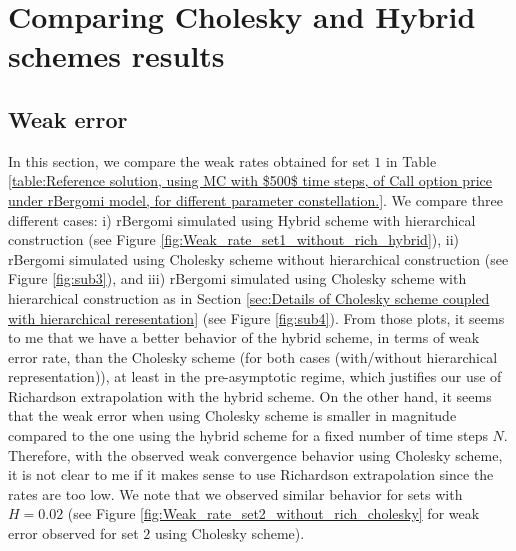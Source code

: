 \documentclass[11pt]{article}
\begin{document}



\section{Comparing Cholesky and Hybrid schemes results }

\subsection{Weak error}
In this section, we compare the weak rates obtained for set $1$ in Table
\ref{table:Reference solution, using MC with $500$ time steps, of Call option price under rBergomi model, for different parameter constellation.}. We compare three different cases: i) rBergomi simulated using Hybrid scheme with hierarchical construction (see Figure \ref{fig:Weak_rate_set1_without_rich_hybrid}), ii) rBergomi simulated using Cholesky scheme without hierarchical construction (see Figure \ref{fig:sub3}), and iii) rBergomi simulated using Cholesky scheme with hierarchical construction as in Section \ref{sec:Details of Cholesky scheme coupled with hierarchical reresentation} (see Figure \ref{fig:sub4}). From those plots, it seems to me that we have a better behavior of the hybrid scheme, in terms of weak error rate, than the Cholesky scheme (for both cases (with/without hierarchical representation)), at least in the pre-asymptotic regime, which justifies our use of Richardson extrapolation with the hybrid scheme. On the other hand, it seems that the weak error when using Cholesky scheme is smaller in magnitude compared to the one using the hybrid scheme for a fixed number of time steps $N$. Therefore, with the observed weak convergence behavior using Cholesky scheme, it is not clear to me if it makes sense to use Richardson extrapolation since the rates are too low.  We note that we observed similar behavior for sets with $H=0.02$ (see Figure \ref{fig:Weak_rate_set2_without_rich_cholesky} for weak error observed for set $2$ using Cholesky scheme).
\end{document}
